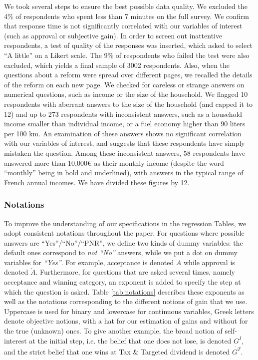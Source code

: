 \documentclass[12pt]{article} %
\begin{document}
We took several steps to ensure the best possible data quality. We excluded the 4\% of respondents who spent less than 7 minutes on the full survey. We confirm that response time is not significantly correlated with our variables of interest (such as approval or subjective gain). In order to screen out inattentive respondents, a test of quality of the responses was inserted, which asked to select ``A little'' on a Likert scale. The 9\% of respondents who failed the test were also excluded, which yields a final sample of 3002 respondents. Also, when the questions about a reform were spread over different pages, we recalled the details of the reform on each new page. We checked for careless or strange answers on numerical questions, such as income or the size of the household. We flagged 10 respondents with aberrant answers to the size of the household (and capped it to 12) and up to 273 respondents with inconsistent answers, such as a household income smaller than individual income, or a fuel economy higher than 90 liters per 100 km. An examination of these answers shows no significant correlation with our variables of interest, and suggests that these respondents have simply mistaken the question. Among these inconsistent answers, 58 respondents have answered more than 10,000\euro{} as their monthly income (despite the word ``monthly'' being in bold and underlined), with answers in the typical range of French annual incomes. We have divided these figures by 12.

\subsubsection{Notations}

To improve the understanding of our specifications in the regression Tables, we adopt consistent notations throughout the paper. For questions where possible answers are ``Yes''/``No''/``PNR'', we define two kinds of dummy variables: the default ones correspond to \textit{not ``No''} answers, while we put a dot on dummy variables for \textit{``Yes''}. For example, acceptance is denoted $A$ while approval is denoted $\dot{A}$. Furthermore, for questions that are asked several times, namely acceptance and winning category, an exponent is added to specify the step at which the question is asked. Table \ref{tab:notations} describes these exponents as well as the notations corresponding to the different notions of gain that we use. Uppercase is used for binary and lowercase for continuous variables, Greek letters denote objective notions, with a hat for our estimation of gains and without for the true (unknown) ones. To give another example, the broad notion of self-interest at the initial step, i.e. the belief that one does not lose, is denoted $G^I$, and the strict belief that one wins at Tax \& Targeted dividend is denoted $\dot{G^T}$.
\end{document}
